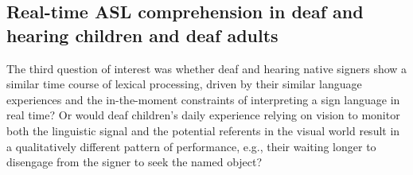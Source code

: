 \documentclass[oneside]{report}
\begin{document}
\subsection{Real-time ASL comprehension in deaf and hearing children and
deaf
adults}\label{real-time-asl-comprehension-in-deaf-and-hearing-children-and-deaf-adults}

The third question of interest was whether deaf and hearing native
signers show a similar time course of lexical processing, driven by
their similar language experiences and the in-the-moment constraints of
interpreting a sign language in real time? Or would deaf children's
daily experience relying on vision to monitor both the linguistic signal
and the potential referents in the visual world result in a
qualitatively different pattern of performance, e.g., their waiting
longer to disengage from the signer to seek the named object?
\end{document}
